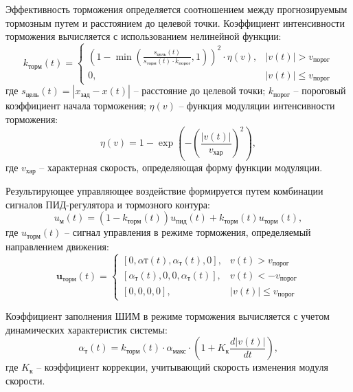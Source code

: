 Эффективность торможения определяется соотношением между прогнозируемым тормозным путем
и расстоянием до целевой точки. Коэффициент интенсивности торможения вычисляется с использованием нелинейной функции:
\begin{equation*}\label{eq:braking_intensity_expanded}
	k_{\text{торм}}(t) = \begin{cases}
		\left(1 - \min\left(\frac{s_{\text{цель}}(t)}{s_{\text{торм}}(t) \cdot k_{\text{порог}}}, 1\right)\right)^2 \cdot \eta(v), & |v(t)| > v_{\text{порог}}    \\
		0,                                                                                                                         & |v(t)| \leq v_{\text{порог}}
	\end{cases}
\end{equation*}
где $s_{\text{цель}}(t) = |x_{\text{зад}} - x(t)|$ -- расстояние до целевой точки;
$k_{\text{порог}}$ -- пороговый коэффициент начала торможения;
$\eta(v)$ -- функция модуляции интенсивности торможения:
\begin{equation*}\label{eq:modulation_function}
	\eta(v) = 1 - \exp\left(-\left(\frac{|v(t)|}{v_{\text{хар}}}\right)^2\right),
\end{equation*}
где $v_{\text{хар}}$ -- характерная скорость, определяющая форму функции модуляции.

Результирующее управляющее воздействие формируется путем комбинации сигналов ПИД-регулятора и тормозного контура:
\begin{equation*}\label{eq:combined_control}
	u_{\text{м}}(t) = (1 - k_{\text{торм}}(t))u_{\text{пид}}(t) + k_{\text{торм}}(t)u_{\text{торм}}(t),
\end{equation*}
где $u_{\text{торм}}(t)$ -- сигнал управления в режиме торможения, определяемый направлением движения:
\begin{equation*}\label{eq:braking_control_expanded}
	\mathbf{u}_{\text{торм}}(t) = \begin{cases}
		[0, \alpha{\text{т}}(t), \alpha_{\text{т}}(t), 0],  & v(t) > v_{\text{порог}}      \\
		[\alpha_{\text{т}}(t), 0, 0, \alpha_{\text{т}}(t)], & v(t) < -v_{\text{порог}}     \\
		[0, 0, 0, 0],                                       & |v(t)| \leq v_{\text{порог}}
	\end{cases}
\end{equation*}

Коэффициент заполнения ШИМ в режиме торможения вычисляется с учетом динамических характеристик системы:
\begin{equation*}\label{eq:braking_pwm_expanded}
	\alpha_{\text{т}}(t) = k_{\text{торм}}(t) \cdot \alpha_{\text{макс}} \cdot \left(1 + K_{\text{к}}\frac{d|v(t)|}{dt}\right),
\end{equation*}
где $K_{\text{к}}$ -- коэффициент коррекции, учитывающий скорость изменения модуля скорости.

